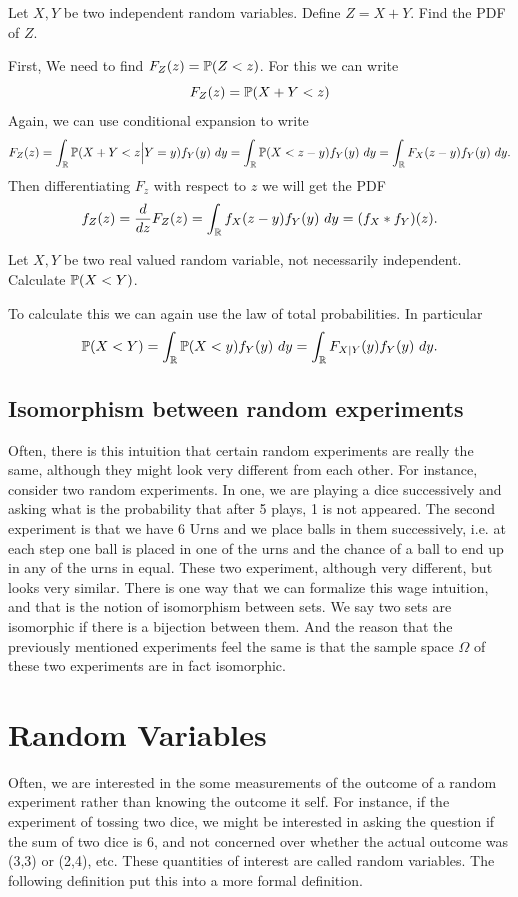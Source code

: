 \begin{example}
	Let $ X,Y $ be two independent random variables. Define $ Z = X+Y $. Find the PDF of $ Z $. 
	\begin{solution}
		First, We need to find $ F_Z(z) = \mathbb{P}(Z<z) $. For this we can write
		\[ F_Z(z) = \mathbb{P}(X+Y < z) \]
		Again, we can use conditional expansion to write
		\[ F_Z(z) = \int_{\mathbb{R}} \mathbb{P}(X+Y<z\big| Y = y)f_Y(y)\ dy = \int_{\mathbb{R}} \mathbb{P}(X<z-y)f_Y(y)\ dy  = \int_{\mathbb{R}} F_X(z-y)f_Y(y)\ dy. \]
		Then differentiating $ F_z $ with respect to $ z $ we will get the PDF 
		\[ f_Z(z) = \frac{d }{dz}F_Z(z) =  \int_{\mathbb{R}} f_X(z-y)f_Y(y)\ dy = (f_X * f_Y)(z).\]
	\end{solution}
\end{example}

\begin{example}
	Let $ X,Y $ be two real valued random variable, not necessarily independent. Calculate $ \mathbb{P}(X<Y) $.
	\begin{solution}
		To calculate this we can again use the law of total probabilities. In particular
		\[ \prob(X<Y) = \int_{\R}\prob(X<y)f_Y(y)\ dy = \int_{\R}F_{X|Y}(y)f_Y(y)\ dy. \]
	\end{solution}
\end{example}





\subsection{Isomorphism between random experiments}
Often, there is this intuition that certain random experiments are really the same, although they might look very different from each other. For instance, consider two random experiments. In one, we are playing a dice successively and asking what is the probability that after 5 plays, 1 is not appeared. The second experiment is that we have 6 Urns and we place balls in them successively, i.e. at each step one ball is placed in one of the urns and the chance of a ball to end up in any of the urns in equal. These two experiment, although very different, but looks very similar. There is one way that we can formalize this wage intuition, and that is the notion of isomorphism between sets. We say two sets are isomorphic if there is a bijection between them. And the reason that the previously mentioned experiments feel the same is that the sample space $\Omega$ of these two experiments are in fact isomorphic. 

\section{Random Variables}
Often, we are interested in the some measurements of the outcome of a random experiment rather than knowing the outcome it self. For instance, if the experiment of tossing two dice, we might be interested in asking the question if the sum of two dice is 6, and not concerned over whether the actual outcome was (3,3) or (2,4), etc. These quantities of interest are called random variables. The following definition put this into a more formal definition.

